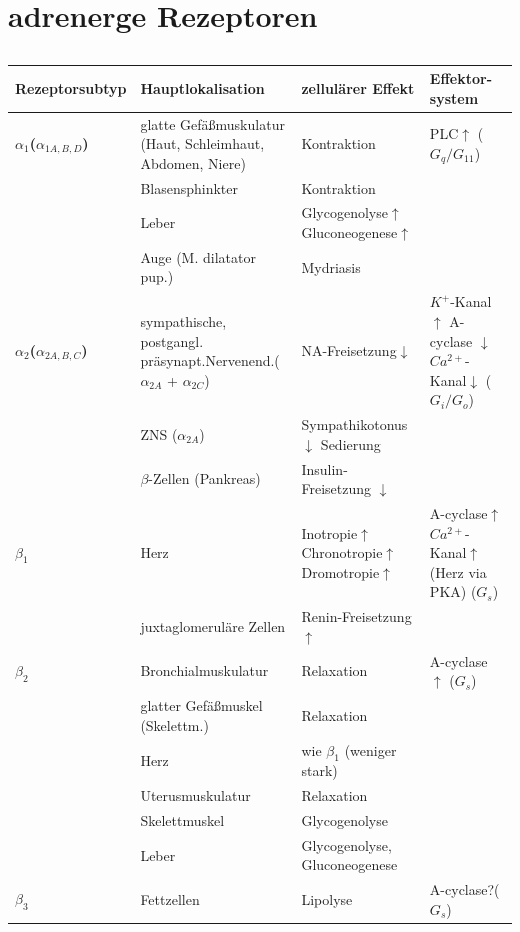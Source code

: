 \documentclass[10pt,a4paper]{report}
\begin{document}
\section{adrenerge Rezeptoren}
\begin{table}[htbp]
\caption{}
\begin{tabularx}{\textwidth}{XXXX}
\hline
\textbf{Rezeptorsubtyp} & \textbf{Hauptlokalisation} & \textbf{zellulärer Effekt} & \textbf{Effektor- system} \\ \hline
\textbf{$\alpha_1$($\alpha_{1A,B,D}$)} & glatte Gefäßmuskulatur (Haut, Schleimhaut, Abdomen, Niere) & Kontraktion & PLC$\uparrow$ ($G_q/G_{11}$) \\ \hline
& Blasensphinkter & Kontraktion & \\ \hline
& Leber & Glycogenolyse$\uparrow$ Gluconeogenese$\uparrow$ &  \\ \hline
& Auge (M. dilatator pup.) & Mydriasis & \textbf{} \\ \hline
\textbf{$\alpha_2$($\alpha_{2A,B,C}$)} & sympathische, postgangl. präsynapt.Nervenend.($\alpha_{2A}$ + $\alpha_{2C}$)&NA-Freisetzung$\downarrow$ &  $K^+$-Kanal$\uparrow$ A-cyclase $\downarrow$ $Ca^{2+}$-Kanal$\downarrow$ ($G_i/G_o$) \\ \hline
& ZNS	($\alpha_{2A}$) & Sympathikotonus $\downarrow$ Sedierung &  \\ \hline
& $\beta$-Zellen (Pankreas) & Insulin-Freisetzung $\downarrow$ & \\ \hline
{$\beta_1$} & Herz & Inotropie$\uparrow$ Chronotropie$\uparrow$ Dromotropie$\uparrow$ &  A-cyclase$\uparrow$ $Ca^{2+}$-Kanal$\uparrow$ (Herz via PKA) ($G_s$) \\ \hline
& juxtaglomeruläre Zellen & Renin-Freisetzung $\uparrow$ & \\ \hline
\textbf{$\beta_2$} & Bronchialmuskulatur & Relaxation & A-cyclase $\uparrow$ ($G_s$) \\ \hline
& glatter Gefäßmuskel (Skelettm.) & Relaxation & \\ \hline
& Herz & wie $\beta_1$ (weniger stark) & \\ \hline
& Uterusmuskulatur & Relaxation &  \\ \hline
& Skelettmuskel & Glycogenolyse &  \\ \hline
& Leber & Glycogenolyse, Gluconeogenese & \\ \hline
\textbf{$\beta_3$} & Fettzellen & Lipolyse & A-cyclase?($G_s$) \\ \hline
\end{tabularx}
\label{}
\end{table}
\end{document}
